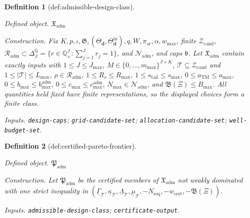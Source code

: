 \documentclass{article}
\newtheorem{definition}{Definition}
\begin{document}
\begin{definition}[def:admissible-design-class]\label{def:admissible-design-class}
\par\smallskip\noindent\emph{Defined object.} \(\mathfrak X_{\mathrm{adm}}\)
\par\smallskip\noindent\emph{Construction.} Fix \(K,p,\iota,\mathfrak G,(\Theta_{\boldsymbol d},\Theta^{\mathrm{in}}_{\boldsymbol d}),q,W,\pi_{\mathrm{ar}},\alpha,w_{\max}\), finite \(\mathcal Z_{\mathrm{cand}}\), \(\mathcal R_{\mathrm{adm}}\subset\Delta_J^{\mathbb Q}=\{r\in\mathbb Q_+^J:\sum_{j=1}^{J}r_j=1\}\), and \(\mathcal N_{\mathrm{adm}}\), and caps \(\mathfrak b\). Let \(\mathfrak X_{\mathrm{adm}}\) contain exactly inputs with \(1\leq J\leq J_{\max}\), \(M\in\{0,\ldots,m_{\max}\}^{J\times K}\), \(\mathcal T\subseteq\mathcal Z_{\mathrm{cand}}\) and \(1\leq|\mathcal T|\leq L_{\max}\), \(\rho\in\mathcal R_{\mathrm{adm}}\), \(1\leq R_s\leq R_{\max}\), \(1\leq s_{\mathrm{tail}}\leq s_{\max}\), \(0\leq a_{\mathrm{TM}}\leq a_{\max}\), \(0\leq b_{\max}\leq b_{\max}^{\mathrm{adm}}\), \(0\leq c_{\max}\leq c_{\max}^{\mathrm{adm}}\), \(N_{\max}\in\mathcal N_{\mathrm{adm}}\), and \(\mathfrak B(\Xi)\leq B_{\max}\). All quantities held fixed have finite representations, so the displayed choices form a finite class.
\par\smallskip\noindent\emph{Inputs.} \texttt{design-\allowbreak{}caps}; \texttt{grid-\allowbreak{}candidate-\allowbreak{}set}; \texttt{allocation-\allowbreak{}candidate-\allowbreak{}set}; \texttt{well-\allowbreak{}budget-\allowbreak{}set}.
\end{definition}

\begin{definition}[def:certified-pareto-frontier]\label{def:certified-pareto-frontier}
\par\smallskip\noindent\emph{Defined object.} \(\mathfrak P_{\mathrm{adm}}\)
\par\smallskip\noindent\emph{Construction.} Let \(\mathfrak P_{\mathrm{adm}}\) be the certified members of \(\mathfrak X_{\mathrm{adm}}\) not weakly dominated with one strict inequality in \((\underline\Gamma_{\mathcal T},\underline\kappa_{\mathcal T},\underline\Lambda_{\mathcal T},\underline\mu_{\mathcal T},-N_{\mathrm{req}},-w_{\mathrm{cert}},-\mathfrak B(\Xi))\).
\par\smallskip\noindent\emph{Inputs.} \texttt{admissible-\allowbreak{}design-\allowbreak{}class}; \texttt{certificate-\allowbreak{}output}.
\end{definition}
\end{document}
